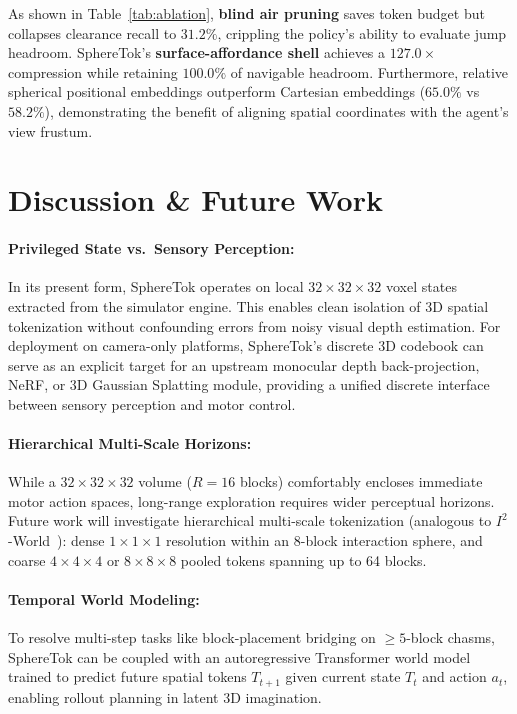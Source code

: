 \documentclass[10pt,twocolumn,letterpaper]{article}
\begin{document}
As shown in Table~\ref{tab:ablation}, \textbf{blind air pruning} saves token budget but collapses clearance recall to $31.2\%$, crippling the policy's ability to evaluate jump headroom. SphereTok's \textbf{surface-affordance shell} achieves a $127.0\times$ compression while retaining $100.0\%$ of navigable headroom. Furthermore, relative spherical positional embeddings outperform Cartesian embeddings ($65.0\%$ vs $58.2\%$), demonstrating the benefit of aligning spatial coordinates with the agent's view frustum.

\section{Discussion \& Future Work}

\paragraph{Privileged State vs.~Sensory Perception:} In its present form, SphereTok operates on local $32 \times 32 \times 32$ voxel states extracted from the simulator engine. This enables clean isolation of 3D spatial tokenization without confounding errors from noisy visual depth estimation. For deployment on camera-only platforms, SphereTok's discrete 3D codebook can serve as an explicit target for an upstream monocular depth back-projection, NeRF, or 3D Gaussian Splatting module, providing a unified discrete interface between sensory perception and motor control.

\paragraph{Hierarchical Multi-Scale Horizons:} While a $32 \times 32 \times 32$ volume ($R = 16$ blocks) comfortably encloses immediate motor action spaces, long-range exploration requires wider perceptual horizons. Future work will investigate hierarchical multi-scale tokenization (analogous to $I^2$-World~\cite{isquaredworld2025}): dense $1\times 1\times 1$ resolution within an 8-block interaction sphere, and coarse $4\times 4\times 4$ or $8\times 8\times 8$ pooled tokens spanning up to 64 blocks.

\paragraph{Temporal World Modeling:} To resolve multi-step tasks like block-placement bridging on $\ge 5$-block chasms, SphereTok can be coupled with an autoregressive Transformer world model trained to predict future spatial tokens $T_{t+1}$ given current state $T_t$ and action $a_t$, enabling rollout planning in latent 3D imagination.
\end{document}
